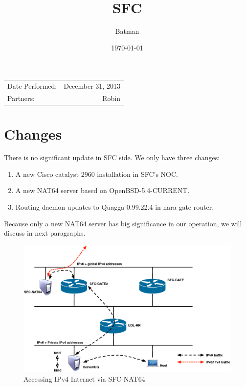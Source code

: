 \documentclass{article}
\title{SFC} %
\author{Batman} %
\date{\today} %
\begin{document}
\maketitle %

\begin{center}
\begin{tabular}{l r}
Date Performed: & December 31, 2013 \\ %
Partners: & Robin \\ %
\end{tabular}
\end{center}



\section{Changes}

There is no significant update in SFC side.  
We only have three changes:
\begin{enumerate}
\item A new Cisco catalyst 2960 installation in SFC's NOC. 
\item A new NAT64 server based on OpenBSD-5.4-CURRENT.
\item Routing daemon updates to Quagga-0.99.22.4 in nara-gate router. 
\end{enumerate}

Because only a new NAT64 server has big significance in our operation, we will discuss in next paragraphs.  

\begin{figure}[h!]
\centering
\includegraphics[width=1.\textwidth]{nat64}
\caption{Accessing IPv4 Internet via SFC-NAT64}
\label{fig:nat64}
\end{figure}
\end{document}

